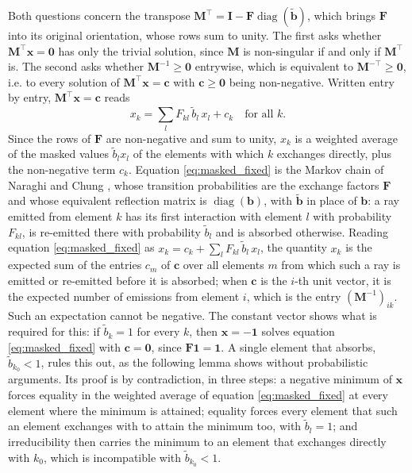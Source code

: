 \documentclass[preprint,1p,times]{elsarticle}
\theoremstyle{plain}
\theoremstyle{definition}
\theoremstyle{remark}
\begin{document}
Both questions concern the transpose $\mathbf{M}^\top = \mathbf{I} - \mathbf{F}\operatorname{diag}(\tilde{\mathbf{b}})$, which brings $\mathbf{F}$ into its original orientation, whose rows sum to unity. The first asks whether $\mathbf{M}^\top\mathbf{x} = \mathbf{0}$ has only the trivial solution, since $\mathbf{M}$ is non-singular if and only if $\mathbf{M}^\top$ is. The second asks whether $\mathbf{M}^{-1} \geq \mathbf{0}$ entrywise, which is equivalent to $\mathbf{M}^{-\top} \geq \mathbf{0}$, i.e. to every solution of $\mathbf{M}^\top\mathbf{x} = \mathbf{c}$ with $\mathbf{c} \geq \mathbf{0}$ being non-negative. Written entry by entry, $\mathbf{M}^\top\mathbf{x} = \mathbf{c}$ reads
\begin{equation}
x_k = \sum_l F_{kl}\, \tilde{b}_l\, x_l + c_k \quad \text{for all } k .
\label{eq:masked_fixed}
\end{equation}
Since the rows of $\mathbf{F}$ are non-negative and sum to unity, $x_k$ is a weighted average of the masked values $\tilde{b}_l x_l$ of the elements with which $k$ exchanges directly, plus the non-negative term $c_k$. 
Equation \eqref{eq:masked_fixed} is the Markov chain of Naraghi and Chung \citep{Naraghi1985}, whose transition probabilities are the exchange factors $\mathbf{F}$ and whose equivalent reflection matrix is $\operatorname{diag}(\mathbf{b})$, with $\tilde{\mathbf{b}}$ in place of $\mathbf{b}$: a ray emitted from element $k$ has its first interaction with element $l$ with probability $F_{kl}$, is re-emitted there with probability $\tilde{b}_l$ and is absorbed otherwise. Reading equation \eqref{eq:masked_fixed} as $x_k = c_k + \sum_l F_{kl}\, \tilde{b}_l\, x_l$, the quantity $x_k$ is the expected sum of the entries $c_m$ of $\mathbf{c}$ over all elements $m$ from which such a ray is emitted or re-emitted before it is absorbed; when $\mathbf{c}$ is the $i$-th unit vector, it is the expected number of emissions from element $i$, which is the entry $(\mathbf{M}^{-1})_{ik}$. Such an expectation cannot be negative. The constant vector shows what is required for this: if $\tilde{b}_k = 1$ for every $k$, then $\mathbf{x} = -\mathbf{1}$ solves equation \eqref{eq:masked_fixed} with $\mathbf{c} = \mathbf{0}$, since $\mathbf{F}\mathbf{1} = \mathbf{1}$. A single element that absorbs, $\tilde{b}_{k_0} < 1$, rules this out, as the following lemma shows without probabilistic arguments. Its proof is by contradiction, in three steps: a negative minimum of $\mathbf{x}$ forces equality in the weighted average of equation \eqref{eq:masked_fixed} at every element where the minimum is attained; equality forces every element that such an element exchanges with to attain the minimum too, with $\tilde{b}_l = 1$; and irreducibility then carries the minimum to an element that exchanges directly with $k_0$, which is incompatible with $\tilde{b}_{k_0} < 1$.
\end{document}
